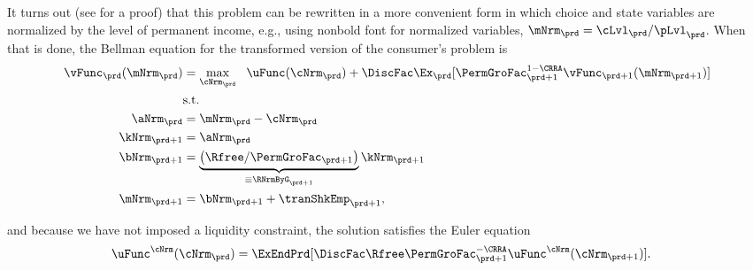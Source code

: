 \documentclass[titlepage, headings=optiontotocandhead]{econark}
\begin{document}


It turns out (see \cite{SolvingMicroDSOPs} for a proof) that this problem can be rewritten in a more convenient form in which choice and state variables are normalized by the level of permanent income, e.g., using nonbold font for normalized variables, $\mNrm_{\prd}=\cLvl_{\prd}/\pLvl_{\prd}$.
When that is done, the Bellman equation for the transformed version of the consumer's problem is
  \begin{equation}\begin{gathered}\begin{aligned}
        \vFunc_{\prd}(\mNrm_{\prd}) & = \max_{{\cNrm}_{\prd}} ~~ \uFunc(\cNrm_{\prd})+\DiscFac \Ex_{\prd}[ \PermGroFac_{\prd+1}^{1-\CRRA}\vFunc_{\prd+1}(\mNrm_{\prd+1})] \label{eq:vNormed}                   \\
                                         & \text{s.t.}                                                                                 \\
        \aNrm_{\prd}                       & = \mNrm_{\prd}-\cNrm_{\prd}                                                                     \\
        \kNrm_{\prd+1}                     & = \aNrm_{\prd}                                                                                \\
        \bNrm_{\prd+1}                     & = \underbrace{\left(\Rfree/\PermGroFac_{\prd+1}\right)}_{\equiv \RNrmByG_{\prd+1}}\kNrm_{\prd+1} \\
        \mNrm_{\prd+1}                        & = \bNrm_{\prd+1}+\tranShkEmp_{\prd+1},
      \end{aligned}\end{gathered}\end{equation}

 and because we have not imposed a liquidity constraint, the solution satisfies the Euler equation
  \begin{equation}\begin{gathered}\begin{aligned}
        \uFunc^{\cNrm}(\cNrm_{\prd})  & = \ExEndPrd[\DiscFac \Rfree \PermGroFac_{\prd+1}^{-\CRRA}\uFunc^{\cNrm}(\cNrm_{\prd+1})] \label{eq:cEuler}.
      \end{aligned}\end{gathered}\end{equation}
\end{document}
